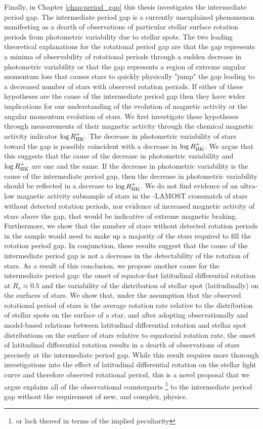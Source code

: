 Finally, in Chapter \ref{chap:period_gap} this thesis investigates the intermediate period gap.
The intermediate period gap is a currently unexplained phenomenon manifesting as a dearth of observations of particular stellar surface rotation periods from photometric variability due to stellar spots.
The two leading theoretical explanations for the rotational period gap are that the gap represents a minima of observability of rotational periods through a sudden decrease in photometric variability or that the gap represents a region of extreme angular momentum loss that causes stars to quickly physically "jump" the gap leading to a decreased number of stars with observed rotation periods.
If either of these hypotheses are the cause of the intermediate period gap then they have wider implications for our understanding of the evolution of magnetic activity or the angular momentum evolution of stars.
We first investigate these hypotheses through measurements of their magnetic activity through the chemical magnetic activity indicator $\log R^{+}_{\rm{HK}}$.
The decrease in photometric variability of stars toward the gap is possibly coincident with a decrease in $\log R^{+}_{\rm{HK}}$.
We argue that this suggests that the cause of the decrease in photometric variability and $\log R^{+}_{\rm{HK}}$ are one and the same.
If the decrease in photometric variability is the cause of the intermediate period gap, then the decrease in photometric variability should be reflected in a decrease to $\log R^{+}_{\rm{HK}}$.
We do not find evidence of an ultra-low magnetic activity subsample of stars in the \kepler-LAMOST crossmatch of stars without detected rotation periods, nor evidence of increased magnetic activity of stars above the gap, that would be indicative of extreme magnetic braking.
Furthermore, we show that the number of stars without detected rotation periods in the \kepler sample would need to make up a majority of the stars required to fill the rotation period gap.
In conjunction, these results suggest that the cause of the intermediate period gap is not a decrease in the detectability of the rotation of stars.
As a result of this conclusion, we propose another cause for the intermediate period gap: the onset of equator-fast latitudinal differential rotation at $R_o \approx 0.5$ and the variability of the distribution of stellar spot (latitudinally) on the surfaces of stars.
We show that, under the assumption that the observed rotational period of stars is the average rotation rate relative to the distribution of stellar spots on the surface of a star, and after adopting observationally and model-based relations between latitudinal differential rotation and stellar spot distributions on the surface of stars relative to equatorial rotation rate, the onset of latitudinal differential rotation results in a dearth of observations of stars precisely at the intermediate period gap.
While this result requires more thorough investigations into the effect of latitudinal differential rotation on the stellar light curve and therefore observed rotational period, this is a novel proposal that we argue explains all of the observational counterparts \footnote{or lack thereof in terms of the implied peculiarity} to the intermediate period gap without the requirement of new, and complex, physics.

